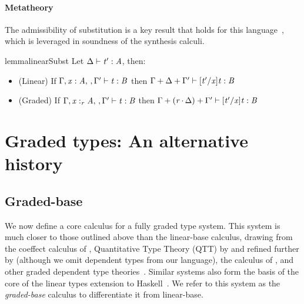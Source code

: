 \paragraph{Metatheory}
The admissibility of substitution is a key result that holds
for this language~\cite{DBLP:journals/pacmpl/OrchardLE19}, which is
leveraged in soundness of the synthesis calculi.
%
\begin{restatable}{lemma}{linearSubst}
Let $\Delta  \vdash  \mathit{t'}  :  \mathit{A}$, then:
\label{lemma:substitution}
\begin{itemize}[leftmargin=1em]
\item (Linear) \hspace{0.04em} If $\Gamma  ,   \mathit{x}  :  \mathit{A}    ,  \,  ,   \Gamma'   \vdash  \mathit{t}  :  \mathit{B}$ then $\Gamma  +  \Delta  +  \Gamma'  \vdash   [  \mathit{t'}  /  \mathit{x}  ]  \mathit{t}   :  \mathit{B}$
\item (Graded) If $\Gamma  \GRANULEsym{,}   \GRANULEmv{x}  :_{\textcolor{coeffectColor}{  \GRANULEnt{r}  } }   \GRANULEnt{A}    \GRANULEsym{,}  \,  \GRANULEsym{,}   \Gamma'   \vdash  \GRANULEnt{t}  :  \GRANULEnt{B}$
then $\Gamma  \GRANULEsym{+}  \GRANULEsym{(}   \textcolor{coeffectColor}{ \GRANULEnt{r}   \textcolor{coeffectColor}{\,\cdot\,} }  \Delta   \GRANULEsym{)}  \GRANULEsym{+}  \Gamma'  \vdash   [  \GRANULEnt{t'}  /  \GRANULEmv{x}  ]  \GRANULEnt{t}   :  \GRANULEnt{B}$
\end{itemize}
\end{restatable}

\section{Graded types: An alternative history}

\subsection{Graded-base}
\label{sec:graded-base}

We now define a core calculus for a fully graded type system. This system is much closer
to those outlined above than the linear-base calculus, drawing from the coeffect calculus of \citet{petricek2014coeffects}, Quantitative Type Theory (QTT) by \citet{McBride2016} and refined further by \citet{quantitative-type-theory} (although we omit dependent types from our language), the calculus of \citet{DBLP:journals/pacmpl/AbelB20}, and other graded dependent type theories~\cite{quantitative-type-theory,DBLP:conf/esop/MoonEO21}. Similar
systems also form the basis of the core of the linear types extension to
Haskell~\cite{DBLP:journals/pacmpl/BernardyBNJS18}. We refer to this system as
the \textit{graded-base} calculus to differentiate it from linear-base.

